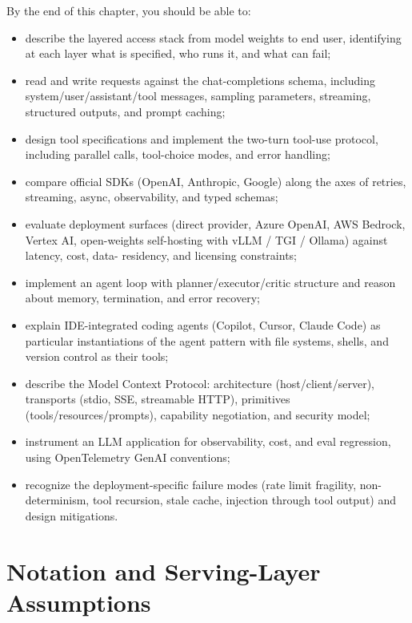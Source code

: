 By the end of this chapter, you should be able to:
\begin{itemize}
  \item describe the layered access stack from model weights to
        end user, identifying at each layer what is specified,
        who runs it, and what can fail;
  \item read and write requests against the chat-completions
        schema, including system/user/assistant/tool messages,
        sampling parameters, streaming, structured outputs, and
        prompt caching;
  \item design tool specifications and implement the two-turn
        tool-use protocol, including parallel calls, tool-choice
        modes, and error handling;
  \item compare official SDKs (OpenAI, Anthropic, Google) along
        the axes of retries, streaming, async, observability, and
        typed schemas;
  \item evaluate deployment surfaces (direct provider, Azure
        OpenAI, AWS Bedrock, Vertex AI, open-weights self-hosting
        with vLLM / TGI / Ollama) against latency, cost, data-
        residency, and licensing constraints;
  \item implement an agent loop with planner/executor/critic
        structure and reason about memory, termination, and error
        recovery;
  \item explain IDE-integrated coding agents (Copilot, Cursor,
        Claude Code) as particular instantiations of the agent
        pattern with file systems, shells, and version control as
        their tools;
  \item describe the Model Context Protocol: architecture
        (host/client/server), transports (stdio, SSE, streamable
        HTTP), primitives (tools/resources/prompts), capability
        negotiation, and security model;
  \item instrument an LLM application for observability, cost,
        and eval regression, using OpenTelemetry GenAI
        conventions;
  \item recognize the deployment-specific failure modes (rate
        limit fragility, non-determinism, tool recursion, stale
        cache, injection through tool output) and design
        mitigations.
\end{itemize}

\section{Notation and Serving-Layer Assumptions}
\label{sec:wk11_notation}

